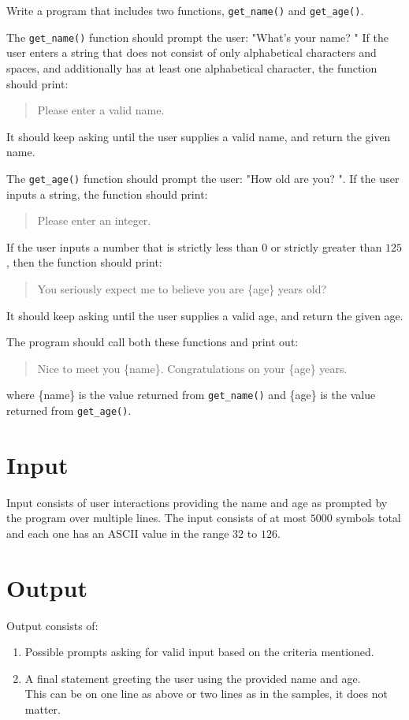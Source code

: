 
Write a program that includes two functions, \texttt{get\_name()} and \texttt{get\_age()}.

The \texttt{get\_name()} function should prompt the user: "What's your name? " If the user enters a string that does not consist of only alphabetical characters and spaces, and additionally has at least one alphabetical character, the function should print:
\begin{quote}
    Please enter a valid name.
\end{quote}
It should keep asking until the user supplies a valid name, and return the given name.

The \texttt{get\_age()} function should prompt the user: "How old are you? ". If the user inputs a string, the function should print:
\begin{quote}
    Please enter an integer.
\end{quote}
If the user inputs a number that is strictly less than $0$ or strictly greater than $125$, then the function should print:
\begin{quote}
    You seriously expect me to believe you are \{age\} years old?
\end{quote}
It should keep asking until the user supplies a valid age, and return the given age.

The program should call both these functions and print out:
\begin{quote}
    Nice to meet you \{name\}. Congratulations on your \{age\} years.
\end{quote}
where \{name\} is the value returned from \texttt{get\_name()} and \{age\} is the value returned from \texttt{get\_age()}.

\section*{Input}
Input consists of user interactions providing the name and age as prompted by the program over multiple lines.
The input consists of at most $5000$ symbols total and each one has an ASCII value in the range $32$ to $126$.

\section*{Output}
Output consists of:
\begin{enumerate}
    \item Possible prompts asking for valid input based on the criteria mentioned.
    \item A final statement greeting the user using the provided name and age.\\
    This can be on one line as above or two lines as in the samples, it does not matter.
\end{enumerate}
